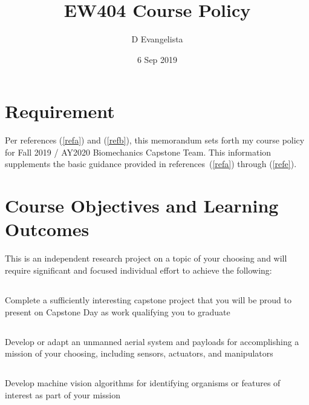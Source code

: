 \documentclass[10pt,courier]{navymemo}
\author{D Evangelista}
\title{EW404 Course Policy}
\date{6 Sep 2019}
\begin{document}
\makedateblock{}

\MEMORANDUM{}

\begin{navyletterheader}
\navyskip{}%

\navysubjline{}
\navyskip{}%
\end{navyletterheader}

\section{Requirement}
Per references (\ref{refa}) and (\ref{refb}), this memorandum sets forth my course policy for Fall 2019 / AY2020 Biomechanics Capstone Team.  This information supplements the basic guidance provided in references~(\ref{refa}) through (\ref{refe}). 

\section{Course Objectives and Learning Outcomes}  This is an independent research project on a topic of your choosing and will require significant and focused individual effort to achieve the following:
\subsection{} Complete a sufficiently interesting capstone project that you will be proud to present on Capstone Day as work qualifying you to graduate
\subsection{} Develop or adapt an unmanned aerial system and payloads for accomplishing a mission of your choosing, including sensors, actuators, and manipulators
\subsection{} Develop machine vision algorithms for identifying organisms or features of interest as part of your mission
\end{document}
